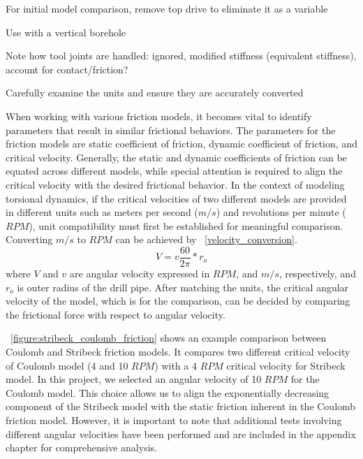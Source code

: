 \begin{bulletedlist}
	\item For initial model comparison, remove top drive to eliminate it as a variable
	\item Use with a vertical borehole

	\item Note how tool joints are handled: ignored, modified stiffness (equivalent stiffness), account for contact/friction?
	\item Carefully examine the units and ensure they are accurately converted
\end{bulletedlist}
\notfinished{}
When working with various friction models, it becomes vital to identify parameters that result in similar frictional behaviors.  The parameters for the friction models are static coefficient of friction, dynamic coefficient of friction, and critical velocity. Generally, the static and dynamic coefficients of friction can be equated across different models, while special attention is required to align the critical velocity with the desired frictional behavior. In the context of modeling torsional dynamics, if the critical velocities of two different models are provided in different units such as meters per second ($m/s$) and revolutions per minute ($RPM$), unit compatibility must first be established for meaningful comparison. Converting $m/s$ to $RPM$ can be achieved by \equationname~\ref{velocity_conversion}.
\begin{equation}\label{velocity_conversion}
  V=v\frac{60}{2\pi}*r_o
\end{equation}
where $V$ and $v$ are angular velocity expressed in $RPM$, and $m/s$, respectively, and $r_o$ is outer radius of the drill pipe. \wordingstart{} After matching the units, the critical angular velocity of the model, which is for the comparison, can be decided by comparing the frictional force with respect to angular velocity. \wordingend{}

\figurename~\ref{figure:stribeck_coulomb_friction} shows an example comparison between Coulomb and Stribeck friction models. It compares two different critical velocity of Coulomb model (4 and 10 $RPM$) with a 4 $RPM$ critical velocity for Stribeck model. In this project, we selected an angular velocity of 10 $RPM$ for the Coulomb model. This choice allows us to align the exponentially decreasing component of the Stribeck model with the static friction inherent in the Coulomb friction model. However, it is important to note that additional tests involving different angular velocities have been performed and are included in the appendix chapter for comprehensive analysis. 

